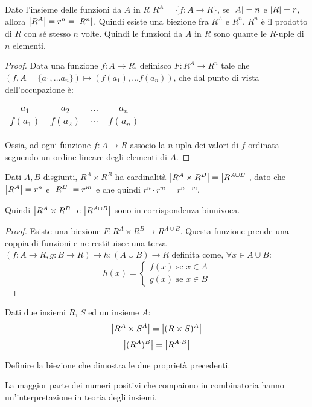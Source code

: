 \begin{prop}
Dato l'insieme delle funzioni da $A$ in $R$ $R^A = \{ f : A \to R\}$, se $\left\lvert{A}\right\rvert = n$ e $\left\lvert{R}\right\rvert = r$, allora $\left\lvert{R^A}\right\rvert = r^n = \left\lvert{R^n}\right\rvert$. Quindi esiste una biezione fra $R^A$ e $R^n$. $R^n$ \`e il prodotto di $R$ con s\'e stesso $n$ volte. Quindi le funzioni da $A$ in $R$ sono quante le $R$-uple di $n$ elementi.
\end{prop}
\begin{proof}
Data una funzione $f : A \to R$, definisco $F : R^A \to R^n$ tale che $(f, A = \{ a_1, \dots a_n\}) \mapsto (f(a_1), \dots f(a_n))$, che dal punto di vista dell'occupazione \`e:

\begin{tabular}{cccc}
$a_1$ & $a_2$ & $\dots$ & $a_n$ \\
$f(a_1)$ & $f(a_2)$ & $\dots$ & $f(a_n)$ 
\end{tabular}

Ossia, ad ogni funzione $f : A \to R$ associo la $n$-upla dei valori di $f$ ordinata seguendo un ordine lineare degli elementi di $A$.
\end{proof}
\begin{prop}
Dati $A, B$ disgiunti, $R^A \times R^B$ ha cardinalit\`a $\left\lvert{R^A \times R^B}\right\rvert = \left\lvert{R^{A \cup B}}\right\rvert$, dato che $\left\lvert{R^A}\right\rvert = r^n$ e $\left\lvert{R^B}\right\rvert = r^m$ e che quindi $r^n \cdot r^m = r^{n + m}$.

Quindi $\left\lvert{R^A \times R^B}\right\rvert $ e $ \left\lvert{R^{A \cup B}}\right\rvert$ sono in corrispondenza biunivoca.
\end{prop}
\begin{proof}
Esiste una biezione $F : R^A \times R^B \to R^{A \cup B}$. Questa funzione prende una coppia di funzioni e ne restituisce una terza $(f : A \to R, g: B \to R) \mapsto h : (A \cup B) \to R$ definita come, $\forall x \in A \cup B$:
\[
h(x) = 
\begin{cases}
f(x) \text{ se } x \in A\\
g(x) \text{ se } x \in B
\end{cases}
\]
\end{proof}
Dati due insiemi $R$, $S$ ed un insieme $A$:
\[
\left\lvert{R^A \times S^A}\right\rvert = \left\lvert{(R \times S)^A}\right\rvert
\]
\[
\left\lvert{(R^A)^B}\right\rvert = \left\lvert{R^{A \cdot B}}\right\rvert
\]
\begin{esercizio}
Definire la biezione che dimostra le due propriet\`a precedenti.
\end{esercizio}

La maggior parte dei numeri positivi che compaiono in combinatoria hanno un'interpretazione in teoria degli insiemi.


